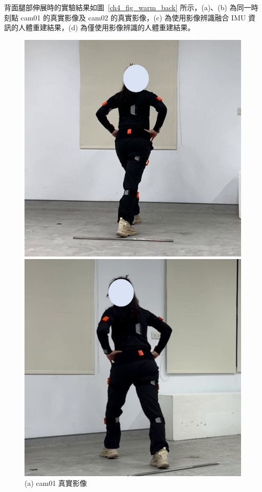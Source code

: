 \clearpage

背面腿部伸展時的實驗結果如圖~\ref{ch4_fig_warm_back} 所示，(a)、(b) 為同一時刻點 cam01 的真實影像及 cam02 的真實影像，(c) 為使用影像辨識融合 IMU 資訊的人體重建結果，(d) 為僅使用影像辨識的人體重建結果。

\begin{figure}[!ht]
   \centering
   \begin{minipage}{.5\textwidth}
      \centering
      \includegraphics[width=.95\linewidth]{figure/ch4_fig_warm_cam01_with4.jpg}
      \caption*{(a) cam01 真實影像}
    \end{minipage}%
    \begin{minipage}{.5\textwidth}
       \centering
       \includegraphics[width=.95\linewidth]{figure/ch4_fig_warm_cam02_with4.jpg}

\end{minipage}
\end{figure}
